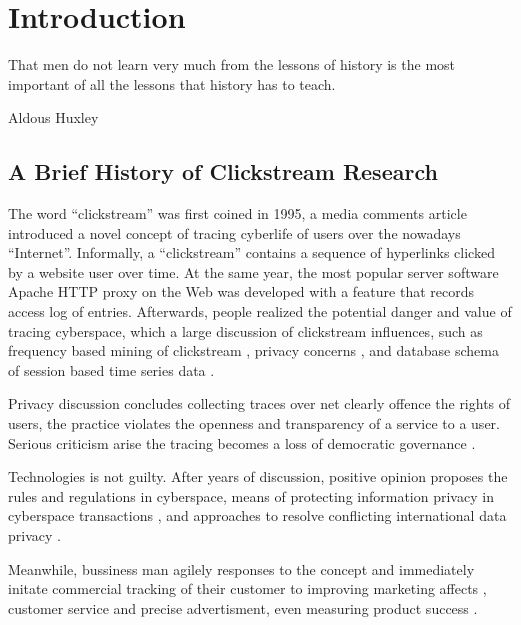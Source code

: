\section{Introduction}
\label{ch:intro}

\epigraph{That men do not learn very much from the lessons of history is the most important of all the lessons that history has to teach.}{Aldous Huxley}

\subsection{A Brief History of Clickstream Research}


The word ``clickstream'' \cite{friedman1995} was first coined in 1995, a media comments 
article introduced a novel concept of tracing cyberlife of users over the nowadays 
``Internet''. Informally, a ``clickstream'' contains a sequence of hyperlinks clicked by a 
website user over time. At the same year, the most popular server software 
Apache HTTP \cite{apache1995http} proxy on the Web was developed with a feature that 
records access log of entries. Afterwards, people realized the potential danger and value 
of tracing cyberspace, which a large discussion of clickstream influences, such as 
frequency based mining of clickstream \cite{brodwin1995}, privacy concerns 
\cite{reidenberg1996governing}, and database schema of session based time series data 
\cite{courtheoux2000database}.


Privacy discussion concludes collecting traces over net clearly offence the rights of users,
the practice violates the openness and transparency of a service to a user.
Serious criticism arise the tracing becomes a loss of democratic governance \cite{gindin1997lost}.

Technologies is not guilty. After years of discussion, positive opinion proposes the rules 
\cite{reidenberg1996governing} and regulations \cite{skok1999establishing} in cyberspace,
means of protecting information privacy in cyberspace transactions \cite{kang1997information},
and approaches to resolve conflicting international data privacy \cite{reidenberg1999resolving}.

Meanwhile, bussiness man agilely responses to the concept and immediately initate 
commercial tracking of their customer to improving marketing affects \cite{novick1995}, 
customer service and precise advertisment\cite{reagle1999platform, bucklin2000sticky}, 
even measuring product success \cite{schonberg2000measuring}.

